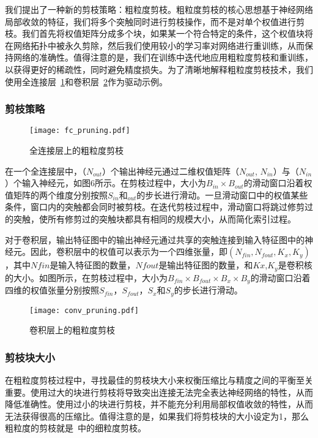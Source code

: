 我们提出了一种新的剪枝策略：粗粒度剪枝。粗粒度剪枝的核心思想基于神经网络局部收敛的特征，我们将多个突触同时进行剪枝操作，而不是对单个权值进行剪枝。我们首先将权值矩阵分成多个块，如果某一个符合特定的条件，这个权值块将在网络拓扑中被永久剪除，然后我们使用较小的学习率对网络进行重训练，从而保持网络的准确性。值得注意的是，我们在训练中迭代地应用粗粒度剪枝和重训练，以获得更好的稀疏性，同时避免精度损失。为了清晰地解释粗粒度剪枝技术，我们使用全连接层~\ref{fig:fc_pruning}和卷积层~\ref{fig:conv_pruning}作为驱动示例。

\subsubsection{剪枝策略}

\begin{figure}[h]
\centering
\texttt{[image: fc\_pruning.pdf]}
\caption{全连接层上的粗粒度剪枝}
\label{fig:fc_pruning}
\end{figure}

在一个全连接层中，（$N_{out}$）个输出神经元通过二维权值矩阵（$N_{out}$, $N_{in}$）与（$N_{in}$）个输入神经元，如图6所示。在剪枝过程中，大小为$B_{in} \times B_{out}$的滑动窗口沿着权值矩阵的两个维度分别按照$S_{in}$和$_{out}$的步长进行滑动。一旦滑动窗口中的权值某些条件，窗口内的突触都会同时被剪枝。在迭代剪枝过程中，滑动窗口将跳过修剪过的突触，使所有修剪过的突触块都具有相同的规模大小，从而简化索引过程。

对于卷积层，输出特征图中的输出神经元通过共享的突触连接到输入特征图中的神经元。因此，卷积层中的权值可以表示为一个四维张量，即$(N_{fin},N_{fout},K_x,K_y)$，其中$N {fin}$是输入特征图的数量，$N {fout}$是输出特征图的数量，和$K x$,$K_y$是卷积核的大小。如图所示，在剪枝过程中，大小为$B_{fin} \times B_{fout} \times B_x \times B_y$的滑动窗口沿着四维的权值张量分别按照$S_{fin}$，$S_{fout}$，$S_x$和$S_y$的步长进行滑动。

\begin{figure}[h]
  \centering
  \texttt{[image: conv\_pruning.pdf]}
  \caption{卷积层上的粗粒度剪枝}
  \label{fig:conv_pruning}
\end{figure}

\subsubsection{剪枝块大小}

在粗粒度剪枝过程中，寻找最佳的剪枝块大小来权衡压缩比与精度之间的平衡至关重要。使用过大的块进行剪枝将导致突出连接无法完全表达神经网络的特性，从而降低准确性。使用过小的块进行剪枝，并不能充分利用局部权值收敛的特性，从而无法获得很高的压缩比。值得注意的是，如果我们将剪枝块的大小设定为1，那么粗粒度的剪枝就是~\cite{han2015learning}中的细粒度剪枝。


